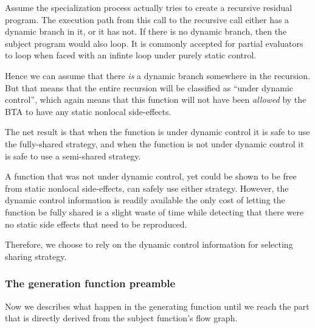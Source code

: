 \begin{docpart}
Assume the specialization process actually tries
to create a recursive residual program. The execution path
from this call to the recursive call either has a dynamic
branch in it, or it has not. If there is no dynamic branch,
then the subject program would also loop. It is commonly
accepted for partial evaluators to loop when faced with
an infinte loop under purely static control.

Hence we can assume that there \emph{is} a dynamic branch
somewhere in the recursion. But that means that the entire
recursion will be classified as ``under dynamic control'', which
again means that this function will not have been \emph{allowed}
by the BTA to have any static nonlocal side-effects.

The net result is that when the function is under dynamic
control it is safe to use the fully-shared strategy, and
when the function is not under dynamic control it is safe
to use a semi-shared strategy.

A function that was not under dynamic control, yet could
be shown to be free from static nonlocal side-effects, can
safely use either strategy. However, the dynamic control
information is readily available the only cost of letting
the function be fully shared is a slight waste of time while
detecting that there were no static side effects that need
to be reproduced.

Therefore, we choose to rely on the dynamic control information
for selecting sharing strategy.

\subsubsection{The generation function preamble}
Now we describes what happen in the generating function until
we reach the part that is directly derived from the subject
function's flow graph.


\end{docpart}
